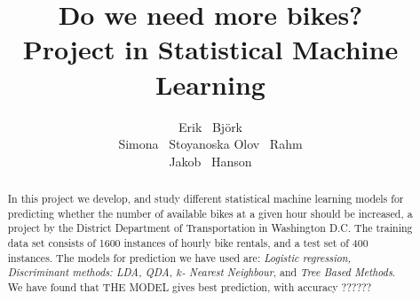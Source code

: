 \documentclass{article}
\title{Do we need more bikes?\\
Project in Statistical Machine Learning}
\author{
  Erik ~Björk\\
  \AND
  Simona ~Stoyanoska
  \AND
  Olov ~Rahm\\
  \AND
  Jakob ~Hanson\\
}
\begin{document}
\maketitle

\begin{abstract}
  In this project we develop, and study different statistical machine learning models for predicting whether the number of available bikes at a given hour should be increased, a project by the District Department of Transportation in Washington D.C. The training data set consists of 1600 instances of hourly bike rentals, and a test set of 400 instances. The models for prediction we have used are: \emph{Logistic regression, Discriminant methods: LDA, QDA, $k$- Nearest Neighbour}, and \emph{Tree Based Methods}. We have found that THE MODEL gives best prediction, with accuracy ??????
\end{abstract}








\appendix


\end{document}

